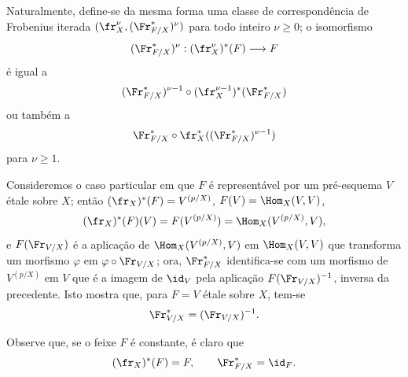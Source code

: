 Naturalmente, define-se da mesma forma uma classe de correspondência de Frobenius iterada $(\fr_X^\nu,(\Fr^*_{F/X})^\nu)$ para todo inteiro $\nu\geq0$; o isomorfismo
\[
(\Fr^*_{F/X})^\nu:(\fr_X^\nu)^*(F)\longrightarrow F
\]
é igual a
\[
(\Fr^*_{F/X})^{\nu-1}\circ (\fr_X^{\nu-1})^*(\Fr^*_{F/X})
\]
ou também a
\[
\Fr^*_{F/X}\circ\fr_X^*((\Fr^*_{F/X})^{\nu-1})
\]
para $\nu\geq1$.

Consideremos o caso particular em que $F$ é representável por um pré-esquema $V$ étale sobre $X$; então $(\fr_X)^*(F)=V^{(p/X)}$, $F(V)=\Hom_X(V,V)$,
\[
(\fr_X)^*(F)(V)=F(V^{(p/X)})=\Hom_X(V^{(p/X)},V),
\]
e $F(\Fr_{V/X})$ é a aplicação de $\Hom_X(V^{(p/X)},V)$ em $\Hom_X(V,V)$ que transforma um morfismo $\varphi$ em $\varphi\circ\Fr_{V/X}$; ora, $\Fr^*_{F/X}$ identifica-se com um morfismo de $V^{(p/X)}$ em $V$ que é a imagem de $\id_V$ pela aplicação $F(\Fr_{V/X})^{-1}$, inversa da precedente. Isto mostra que, para $F=V$ étale sobre $X$, tem-se
\[
\Fr^*_{V/X}=(\Fr_{V/X})^{-1}.
\]

Observe que, se o feixe $F$ é constante, é claro que
\[
(\fr_X)^*(F)=F,
\qquad
\Fr^*_{F/X}=\id_F.
\]
